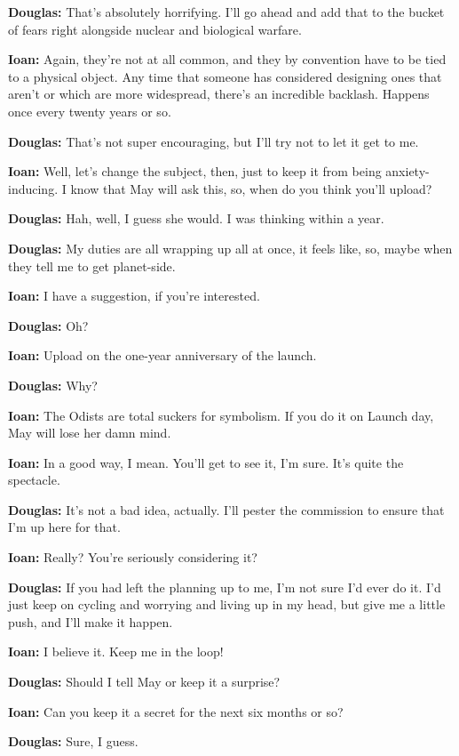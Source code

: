 \textbf{Douglas:} That's absolutely horrifying. I'll go ahead and add that to the bucket of fears right alongside nuclear and biological warfare.

\textbf{Ioan:} Again, they're not at all common, and they by convention have to be tied to a physical object. Any time that someone has considered designing ones that aren't or which are more widespread, there's an incredible backlash. Happens once every twenty years or so.

\textbf{Douglas:} That's not super encouraging, but I'll try not to let it get to me.

\textbf{Ioan:} Well, let's change the subject, then, just to keep it from being anxiety-inducing. I know that May will ask this, so, when do you think you'll upload?

\textbf{Douglas:} Hah, well, I guess she would. I was thinking within a year.

\textbf{Douglas:} My duties are all wrapping up all at once, it feels like, so, maybe when they tell me to get planet-side.

\textbf{Ioan:} I have a suggestion, if you're interested.

\textbf{Douglas:} Oh?

\textbf{Ioan:} Upload on the one-year anniversary of the launch.

\textbf{Douglas:} Why?

\textbf{Ioan:} The Odists are total suckers for symbolism. If you do it on Launch day, May will lose her damn mind.

\textbf{Ioan:} In a good way, I mean. You'll get to see it, I'm sure. It's quite the spectacle.

\textbf{Douglas:} It's not a bad idea, actually. I'll pester the commission to ensure that I'm up here for that.

\textbf{Ioan:} Really? You're seriously considering it?

\textbf{Douglas:} If you had left the planning up to me, I'm not sure I'd ever do it. I'd just keep on cycling and worrying and living up in my head, but give me a little push, and I'll make it happen.

\textbf{Ioan:} I believe it. Keep me in the loop!

\textbf{Douglas:} Should I tell May or keep it a surprise?

\textbf{Ioan:} Can you keep it a secret for the next six months or so?

\textbf{Douglas:} Sure, I guess.

